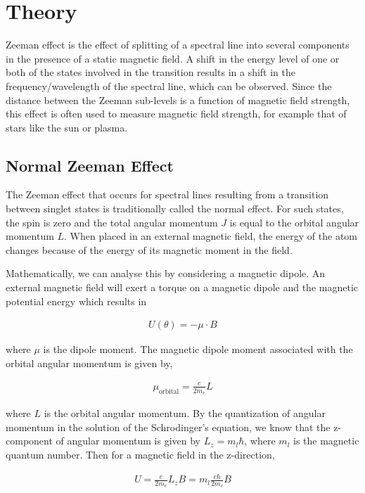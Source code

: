 \section{Theory}

Zeeman effect is the effect of splitting of a spectral line into several components in the presence of a static magnetic field. A shift in the energy level of one or both of the states involved in the transition results in a shift in the frequency/wavelength of the spectral line, which can be observed. Since the distance between the Zeeman sub-levels is a function of magnetic field strength, this effect is often used to measure magnetic field strength, for example that of  stars like the sun or plasma.

\subsection*{Normal Zeeman Effect}

The Zeeman effect that occurs for spectral lines resulting from a transition between
singlet states is traditionally called the normal effect.
For such states, the spin is zero and the total angular momentum $J$ is equal to the
orbital angular momentum $L$. When placed in an external magnetic field, the energy
of the atom changes because of the energy of its magnetic moment in the field. 

Mathematically, we can analyse this by considering a magnetic dipole. An external magnetic field will exert a torque on a magnetic dipole and the magnetic potential energy which results in

\begin{align}
    U(\theta) = -\mu \cdot B
\end{align}

where $\mu$ is the dipole moment. The magnetic dipole moment associated with the orbital angular momentum is given by,

\begin{align}
    \mu_\text{orbital} = \frac{e}{2m_e}L
\end{align}

where $L$ is the orbital angular momentum. By the quantization of angular momentum in the solution of the Schrodinger's equation, we know that the z-component of angular momentum is given by $L_z=m_l\hbar$, where $m_l$ is the magnetic quantum number. Then for a magnetic field in the z-direction, 

\begin{align}
    U = \frac{e}{2m_e}L_zB = m_l\frac{e\hbar}{2m_e}B
\end{align}

